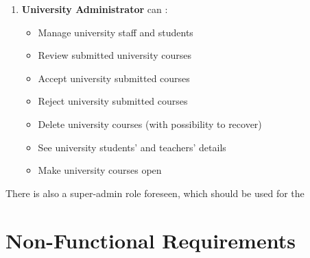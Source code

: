 \documentclass[a4paper,11pt,twoside]{report}
\theoremstyle{definition}
\begin{document}
\begin{enumerate}
    \item \textbf{University Administrator} can :
    \begin{itemize}
        \item Manage university staff and students
        \item Review submitted university courses
        \item Accept university submitted courses
        \item Reject university submitted courses
        \item Delete university courses (with possibility to recover)
        \item See university students' and teachers' details
        \item Make university courses open
    \end{itemize}

\end{enumerate}

There is also a super-admin role foreseen, which should be used for the 

\chapter*{Non-Functional Requirements}
\end{document}
